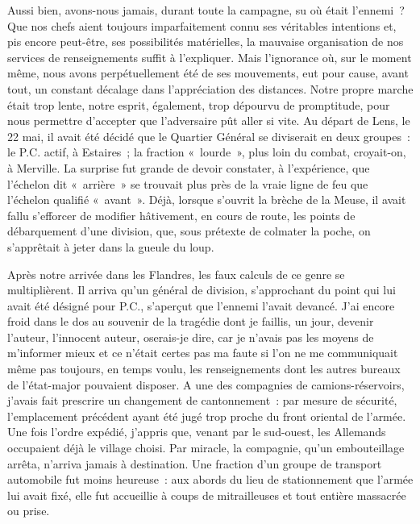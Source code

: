 \documentclass[french,twoside]{book} %
\begin{document}
Aussi bien, avons-nous jamais, durant toute la campagne, su où était l’ennemi ? Que nos chefs aient   toujours imparfaitement connu ses véritables intentions et, pis encore peut-être, ses possibilités matérielles, la mauvaise organisation de nos services de renseignements suffit à l’expliquer. Mais l’ignorance où, sur le moment même, nous avons perpétuellement été de ses mouvements, eut pour cause, avant tout, un constant décalage dans l’appréciation des distances. Notre propre marche était trop lente, notre esprit, également, trop dépourvu de promptitude, pour nous permettre d’accepter que l’adversaire pût aller si vite. Au départ de Lens, le 22 mai, il avait été décidé que le Quartier Général se diviserait en deux groupes : le P.C. actif, à Estaires ; la fraction « lourde », plus loin du combat, croyait-on, à Merville. La surprise fut grande de devoir constater, à l’expérience, que l’échelon dit « arrière » se trouvait plus près de la vraie ligne de feu que l’échelon qualifié « avant ». Déjà, lorsque s’ouvrit la brèche de la Meuse, il avait fallu s’efforcer de modifier hâtivement, en cours de route, les points de débarquement d’une division, que, sous prétexte de colmater la poche, on s’apprêtait à jeter dans la gueule du loup.\par
Après notre arrivée dans les Flandres, les faux calculs de ce genre se multiplièrent. Il arriva qu’un général de division, s’approchant du point qui lui avait été désigné pour P.C., s’aperçut que l’ennemi l’avait devancé. J’ai encore froid dans le dos au souvenir de la tragédie dont je faillis, un jour, devenir l’auteur, l’innocent auteur, oserais-je dire, car je n’avais pas les moyens de m’informer mieux et ce n’était certes pas ma faute si l’on ne me communiquait même pas toujours, en temps voulu, les renseignements dont les autres bureaux de l’état-major pouvaient disposer. A une des compagnies de camions-réservoirs, j’avais fait prescrire un changement de cantonnement : par mesure de sécurité, l’emplacement précédent ayant été jugé trop proche du front oriental de l’armée. Une fois l’ordre expédié, j’appris que, venant par le sud-ouest, les Allemands   occupaient déjà le village choisi. Par miracle, la compagnie, qu’un embouteillage arrêta, n’arriva jamais à destination. Une fraction d’un groupe de transport automobile fut moins heureuse : aux abords du lieu de stationnement que l’armée lui avait fixé, elle fut accueillie à coups de mitrailleuses et tout entière massacrée ou prise.\par
\end{document}
